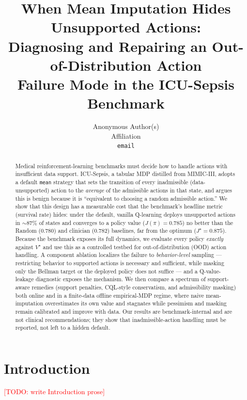 \documentclass{article}
\title{When Mean Imputation Hides Unsupported Actions:\\
Diagnosing and Repairing an Out-of-Distribution Action\\
Failure Mode in the ICU-Sepsis Benchmark}
\author{%
  Anonymous Author(s)\\
  Affiliation\\
  \texttt{email}\\
}
\newcommand{\todo}[1]{\textcolor{red}{[TODO: #1]}}
\begin{document}
\maketitle

\begin{abstract}
Medical reinforcement-learning benchmarks must decide how to handle actions with
insufficient data support. ICU-Sepsis, a tabular MDP distilled from MIMIC-III,
adopts a default \texttt{mean} strategy that sets the transition of every
inadmissible (data-unsupported) action to the \emph{average} of the admissible
actions in that state, and argues this is benign because it is ``equivalent to
choosing a random admissible action.'' We show that this design has a measurable
cost that the benchmark's headline metric (survival rate) hides: under the
default, vanilla Q-learning deploys unsupported actions in $\sim$87\% of states
and converges to a policy value ($J(\pi){=}0.785$) no better than the Random
(0.780) and clinician (0.782) baselines, far from the optimum ($J^\star{=}0.875$).
Because the benchmark exposes its full dynamics, we evaluate every policy
\emph{exactly} against $V^\star$ and use this as a controlled testbed for
out-of-distribution (OOD) action handling. A component ablation localizes the
failure to \emph{behavior-level} sampling --- restricting behavior to supported
actions is necessary and sufficient, while masking only the Bellman target or the
deployed policy does not suffice --- and a Q-value-leakage diagnostic exposes the
mechanism. We then compare a spectrum of support-aware remedies (support
penalties, CQL-style conservatism, and admissibility masking) both online and in
a finite-data offline empirical-MDP regime, where naive mean-imputation
overestimates its own value and stagnates while pessimism and masking remain
calibrated and improve with data. Our results are benchmark-internal and are not
clinical recommendations; they show that inadmissible-action handling must be
reported, not left to a hidden default.
\end{abstract}

\section{Introduction}
\todo{write Introduction prose}
\end{document}
